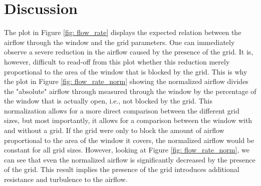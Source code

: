 \section{Discussion} \label{section: discussion}


The plot in Figure \ref{fig: flow_rate} displays the expected relation between the airflow through the window and the grid parameters. One can immediately observe a severe reduction in the airflow caused by the presence of the grid. It is, however, difficult to read-off from this plot whether this reduction merely proportional to the area of the window that is blocked by the grid. This is why the plot in
Figure \ref{fig: flow_rate_norm} showing the normalized airflow divides the "absolute" airflow through measured through the window by the percentage of the window that is actually open, i.e., not blocked by the grid. This normalization allows for a more direct comparison between the different grid sizes, but most importantly, it allows for a comparison between the window with and without a grid. If the grid were only to block the amount of airflow proportional to the area of the window it covers, the normalized airflow would be constant for all grid sizes. However, looking at Figure \ref{fig: flow_rate_norm}, we can see that even the normalized airflow is significantly decreased by the presence of the grid. This result implies the presence of the grid introduces additional resistance and turbulence to the airflow.